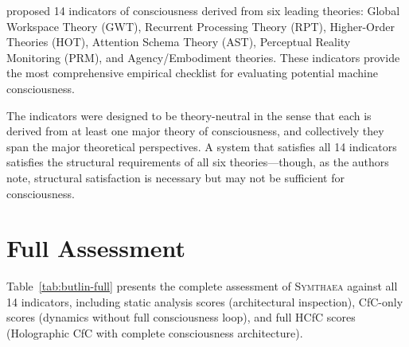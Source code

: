 \documentclass[12pt]{book}
\newcommand{\symthaea}{\textsc{Symthaea}}
\begin{document}
\citet{butlin2023consciousness} proposed 14 indicators of consciousness derived from six leading theories: Global Workspace Theory (GWT), Recurrent Processing Theory (RPT), Higher-Order Theories (HOT), Attention Schema Theory (AST), Perceptual Reality Monitoring (PRM), and Agency/Embodiment theories. These indicators provide the most comprehensive empirical checklist for evaluating potential machine consciousness.

The indicators were designed to be theory-neutral in the sense that each is derived from at least one major theory of consciousness, and collectively they span the major theoretical perspectives. A system that satisfies all 14 indicators satisfies the structural requirements of all six theories---though, as the authors note, structural satisfaction is necessary but may not be sufficient for consciousness.

\section{Full Assessment}

Table~\ref{tab:butlin-full} presents the complete assessment of \symthaea{} against all 14 indicators, including static analysis scores (architectural inspection), CfC-only scores (dynamics without full consciousness loop), and full HCfC scores (Holographic CfC with complete consciousness architecture).
\end{document}
